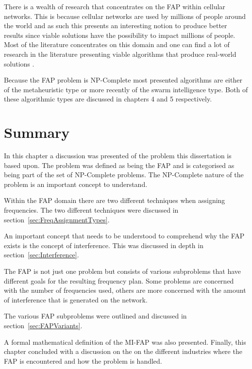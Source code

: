 There is a wealth of research that concentrates on the \gls{FAP} within cellular networks. This is because cellular networks are used by millions of people around the world and as such this presents an interesting notion to produce better results since viable solutions have the possibility to impact millions of people. Most of the literature concentrates on this domain and one can find a lot of research in the literature presenting viable algorithms that produce real-world solutions \cite{Eisenblatter}. 

Because the \gls{FAP} problem is NP-Complete most presented algorithms are either of the metaheuristic type or more recently of the swarm intelligence type. Both of these algorithmic types are discussed in chapters 4 and 5 respectively.
\section{Summary}
In this chapter a discussion was presented of the problem this dissertation is based upon. The problem was defined as being the \gls{FAP} and is categorised as being part of the set of NP-Complete problems. The NP-Complete nature of the problem is an important concept to understand.

Within the \gls{FAP} domain there are two different techniques when assigning frequencies. The two different techniques were discussed in section~\ref{sec:FreqAssignmentTypes}. 

An important concept that needs to be understood to comprehend why the \gls{FAP} exists is the concept of interference. This was discussed in depth in section~\ref{sec:Interference}.

The \gls{FAP} is not just one problem but consists of various subproblems that have different goals for the resulting frequency plan. Some problems are concerned with the number of frequencies used, others are more concerned with the amount of interference that is generated on the network.

The various \gls{FAP} subproblems were outlined and discussed in section~\ref{sec:FAPVariants}.

A formal mathematical definition of the \gls{MI-FAP} was also presented. Finally, this chapter concluded with a discussion on the on the different industries where the FAP is encountered and how the problem is handled.
